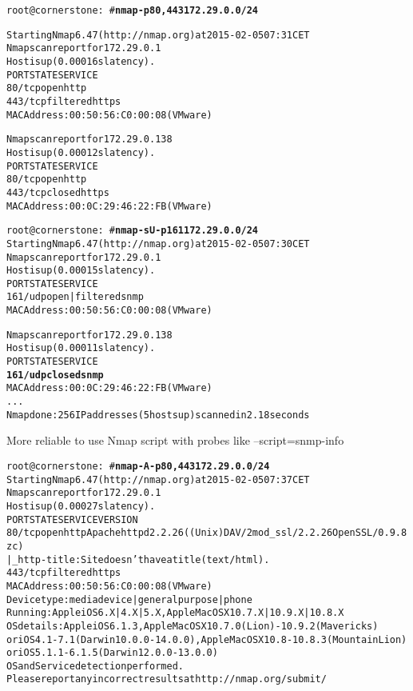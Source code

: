 \documentclass[Screen16to9,17pt]{foils}
\begin{document}

\begin{alltt}\small
root@cornerstone:~#{\bfseries  nmap -p80,443 172.29.0.0/24}

Starting Nmap 6.47 ( http://nmap.org ) at 2015-02-05 07:31 CET
Nmap scan report for 172.29.0.1
Host is up (0.00016s latency).
PORT    STATE    SERVICE
{\color{darkgreen}80/tcp  open     http}
443/tcp filtered https
MAC Address: 00:50:56:C0:00:08 (VMware)

Nmap scan report for 172.29.0.138
Host is up (0.00012s latency).
PORT    STATE  SERVICE
{\color{darkgreen}80/tcp  open   http}
443/tcp closed https
MAC Address: 00:0C:29:46:22:FB (VMware)

\end{alltt}


\begin{alltt}\small
root@cornerstone:~#{\bfseries nmap -sU -p 161 172.29.0.0/24}
Starting Nmap 6.47 ( http://nmap.org ) at 2015-02-05 07:30 CET
Nmap scan report for 172.29.0.1
Host is up (0.00015s latency).
PORT    STATE         SERVICE
{\color{darkgreen}161/udp open|filtered snmp}
MAC Address: 00:50:56:C0:00:08 (VMware)

Nmap scan report for 172.29.0.138
Host is up (0.00011s latency).
PORT    STATE  SERVICE
{\bf{161/udp closed snmp}}
MAC Address: 00:0C:29:46:22:FB (VMware)
...
Nmap done: 256 IP addresses (5 hosts up) scanned in 2.18 seconds
\end{alltt}

\vskip 5mm
\centerline{More reliable to use Nmap script with probes like --script=snmp-info}

\begin{alltt}\footnotesize
root@cornerstone:~#{\bfseries nmap -A -p80,443 172.29.0.0/24}
Starting Nmap 6.47 ( http://nmap.org ) at 2015-02-05 07:37 CET
Nmap scan report for 172.29.0.1
Host is up (0.00027s latency).
PORT    STATE    SERVICE VERSION
80/tcp  open     http    Apache httpd 2.2.26 ((Unix) DAV/2 mod_ssl/2.2.26 OpenSSL/0.9.8zc)
|_http-title: Site doesn't have a title (text/html).
443/tcp filtered https
MAC Address: 00:50:56:C0:00:08 (VMware)
Device type: media device|general purpose|phone
Running: Apple iOS 6.X|4.X|5.X, Apple Mac OS X 10.7.X|10.9.X|10.8.X
OS details: Apple iOS 6.1.3, Apple Mac OS X 10.7.0 (Lion) - 10.9.2 (Mavericks)
or iOS 4.1 - 7.1 (Darwin 10.0.0 - 14.0.0), Apple Mac OS X 10.8 - 10.8.3 (Mountain Lion)
or iOS 5.1.1 - 6.1.5 (Darwin 12.0.0 - 13.0.0)
OS and Service detection performed.
Please report any incorrect results at http://nmap.org/submit/
\end{alltt}
\end{document}
